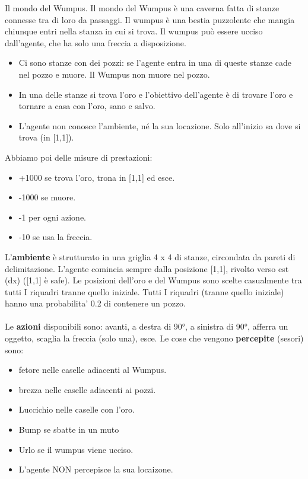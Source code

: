 \begin{example}
    Il mondo del Wumpus. Il mondo del Wumpus è una caverna fatta di stanze connesse tra di loro da
    passaggi. Il wumpus è una bestia puzzolente che mangia chiunque entri nella stanza in
    cui si trova. Il wumpus può essere ucciso dall’agente, che ha solo una freccia a disposizione.
    \begin{itemize}
        \item Ci sono stanze con dei pozzi: se l’agente entra in una di queste stanze cade nel pozzo e muore. Il Wumpus non muore nel pozzo.
        \item In una delle stanze si trova l’oro e l’obiettivo dell’agente è di trovare l’oro e tornare a casa con l’oro, sano e salvo.
        \item L’agente non conosce l’ambiente, né la sua locazione. Solo all’inizio sa dove si trova (in [1,1]).
    \end{itemize}
    Abbiamo poi delle misure di prestazioni:
    \begin{itemize}
        \item +1000 se trova l'oro, trona in [1,1] ed esce.
        \item -1000 se muore.
        \item -1 per ogni azione.
        \item -10 se usa la freccia.
    \end{itemize}
    L'\textbf{ambiente} è strutturato in una griglia 4 x 4 di stanze, circondata da pareti di delimitazione.
    L’agente comincia sempre dalla posizione [1,1], rivolto verso est (dx) ([1,1] è safe).
    Le posizioni dell’oro e del Wumpus sono scelte casualmente tra tutti I riquadri tranne quello iniziale.
    Tutti I riquadri (tranne quello iniziale) hanno una probabilita’ 0.2 di contenere un pozzo.\\\\
    Le \textbf{azioni} disponibili sono: avanti, a destra di 90°, a sinistra di 90°, afferra un oggetto, scaglia la freccia (solo una), esce.
    Le cose che vengono \textbf{percepite} (sesori) sono:
    \begin{itemize}
        \item fetore nelle caselle adiacenti al Wumpus.
        \item brezza nelle caselle adiacenti ai pozzi.
        \item Luccichio nelle caselle con l'oro.
        \item Bump se sbatte in un muto
        \item Urlo se il wumpus viene ucciso.
        \item L'agente NON percepisce la sua locaizone.
    \end{itemize}
\end{example}

